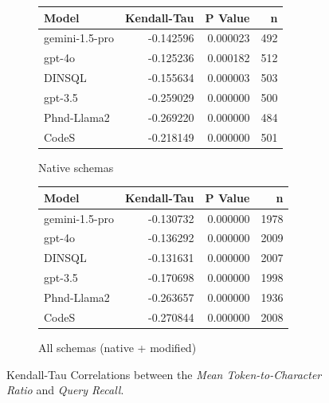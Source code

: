 \begin{figure}
  \centering
  \begin{subfigure}{.5\linewidth}
      \centering
      \begin{tabular}{lrrr}
\toprule
Model & Kendall-Tau & P Value & n \\
\midrule
gemini-1.5-pro & -0.142596 & 0.000023 & 492 \\
gpt-4o & -0.125236 & 0.000182 & 512 \\
DINSQL & -0.155634 & 0.000003 & 503 \\
gpt-3.5 & -0.259029 & 0.000000 & 500 \\
Phnd-Llama2 & -0.269220 & 0.000000 & 484 \\
CodeS & -0.218149 & 0.000000 & 501 \\
\bottomrule
\end{tabular}

      \caption{Native schemas}
      \label{table:tokenratio-recall-ktau-native}
  \end{subfigure}%
  \begin{subfigure}{.5\linewidth}
      \centering
      \begin{tabular}{lrrr}
\toprule
Model & Kendall-Tau & P Value & n \\
\midrule
gemini-1.5-pro & -0.130732 & 0.000000 & 1978 \\
gpt-4o & -0.136292 & 0.000000 & 2009 \\
DINSQL & -0.131631 & 0.000000 & 2007 \\
gpt-3.5 & -0.170698 & 0.000000 & 1998 \\
Phnd-Llama2 & -0.263657 & 0.000000 & 1936 \\
CodeS & -0.270844 & 0.000000 & 2008 \\
\bottomrule
\end{tabular}

      \caption{All schemas (native + modified)}
      \label{table:tokenratio-recall-ktau-all}
  \end{subfigure}
  \caption{Kendall-Tau Correlations between the \emph{Mean Token-to-Character Ratio} and \emph{Query Recall}.}
\end{figure}

